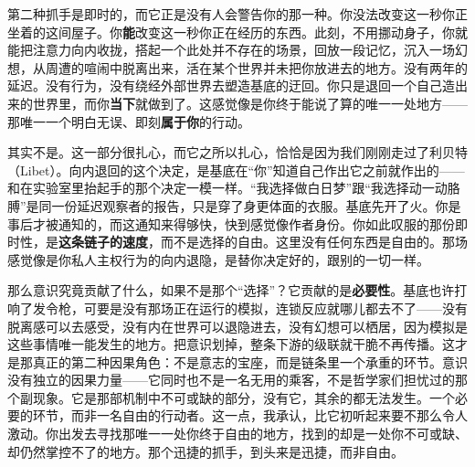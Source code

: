 \documentclass[11pt, twoside, openright]{book}
\begin{document}
第二种抓手是即时的，而它正是没有人会警告你的那一种。你没法改变这一秒你正坐着的这间屋子。你\textbf{能}改变这一秒你正在经历的东西。此刻，不用挪动身子，你就能把注意力向内收拢，搭起一个此处并不存在的场景，回放一段记忆，沉入一场幻想，从周遭的喧闹中脱离出来，活在某个世界并未把你放进去的地方。没有两年的延迟。没有行为，没有绕经外部世界去塑造基底的迂回。你只是退回一个自己造出来的世界里，而你\textbf{当下}就做到了。这感觉像是你终于能说了算的唯一一处地方------那唯一一个明白无误、即刻\textbf{属于你}的行动。

其实不是。这一部分很扎心，而它之所以扎心，恰恰是因为我们刚刚走过了利贝特（Libet）。向内退回的这个决定，是基底在“你”知道自己作出它之前就作出的------和在实验室里抬起手的那个决定一模一样。“我选择做白日梦”跟“我选择动一动胳膊”是同一份延迟观察者的报告，只是穿了身更体面的衣服。基底先开了火。你是事后才被通知的，而这通知来得够快，快到感觉像作者身份。你如此叹服的那份即时性，是\textbf{这条链子的速度}，而不是选择的自由。这里没有任何东西是自由的。那场感觉像是你私人主权行为的向内退隐，是替你决定好的，跟别的一切一样。

那么意识究竟贡献了什么，如果不是那个“选择”？它贡献的是\textbf{必要性}。基底也许打响了发令枪，可要是没有那场正在运行的模拟，连锁反应就哪儿都去不了------没有脱离感可以去感受，没有内在世界可以退隐进去，没有幻想可以栖居，因为模拟是这些事情唯一能发生的地方。把意识划掉，整条下游的级联就干脆不再传播。这才是那真正的第二种因果角色：不是意志的宝座，而是链条里一个承重的环节。意识没有独立的因果力量------它同时也不是一名无用的乘客，不是哲学家们担忧过的那个副现象。它是那部机制中不可或缺的部分，没有它，其余的都无法发生。一个必要的环节，而非一名自由的行动者。这一点，我承认，比它初听起来要不那么令人激动。你出发去寻找那唯一一处你终于自由的地方，找到的却是一处你不可或缺、却仍然掌控不了的地方。那个迅捷的抓手，到头来是迅捷，而非自由。
\end{document}
